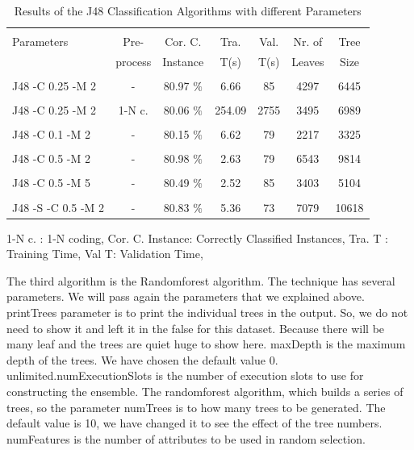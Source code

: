 \documentclass[a4paper]{article}
\begin{document}
\begin{table}
\begin{tabular}{|l| c | c | c | c |c |c |}

\hline & & & & & & \\
Parameters & Pre- & Cor. C.& Tra. & Val. & Nr. of  &  Tree  \\
 & process  & Instance & T(s) &  T(s) & Leaves & Size \\
\hline & & & & & & \\
J48 -C 0.25 -M 2 	 & - &			80.97  $\%$ & 6.66 & 85 & 4297  & 6445 \\ 
\hline & & & & & & \\
J48 -C 0.25 -M 2 	& 1-N c. &	80.06 $\%$ & 254.09 & 2755 & 3495  & 6989  \\ 
\hline & & & & & & \\
J48 -C 0.1 -M 2 	 & - &			80.15  $\%$ & 6.62 & 79 &  2217 & 3325\\ 
\hline & & & & & & \\
J48 -C 0.5 -M 2 	& - &			80.98 $\%$ & 2.63 & 79 &  6543 & 9814 \\ 
\hline & & & & & & \\
J48 -C 0.5 -M 5  	 & - &			80.49 $\%$ & 2.52 & 85 &  3403 & 5104 \\ 
\hline & & & & & & \\
J48 -S -C 0.5 -M 2 	& -&			 80.83 $\%$ & 5.36 &  73 & 7079 & 10618\\ 
\hline
\end{tabular}
\caption{Results of the J48 Classification Algorithms with different Parameters}
	1-N c. : 1-N coding,
	Cor. C. Instance:  Correctly Classified Instances,
	Tra. T : Training Time,
	Val T: Validation Time,
\end{table}

The third algorithm is the Randomforest algorithm. The technique has several
parameters. We will pass again the parameters that we explained above. printTrees
parameter is to print the individual trees in the output. So, we do not need to
show it and left it in the false for this dataset. Because there will be many
leaf and the trees are quiet huge to show here. maxDepth is the maximum depth
of the trees. We have chosen the default value 0. unlimited.numExecutionSlots
is the number of execution slots to use for constructing the ensemble. The
randomforest algorithm, which builds a series of trees, so the parameter
numTrees is to how many trees to be generated. The default value is 10, we have
changed it to see the effect of the tree numbers. numFeatures is the number of
attributes to be used in random selection. 
\end{document}
